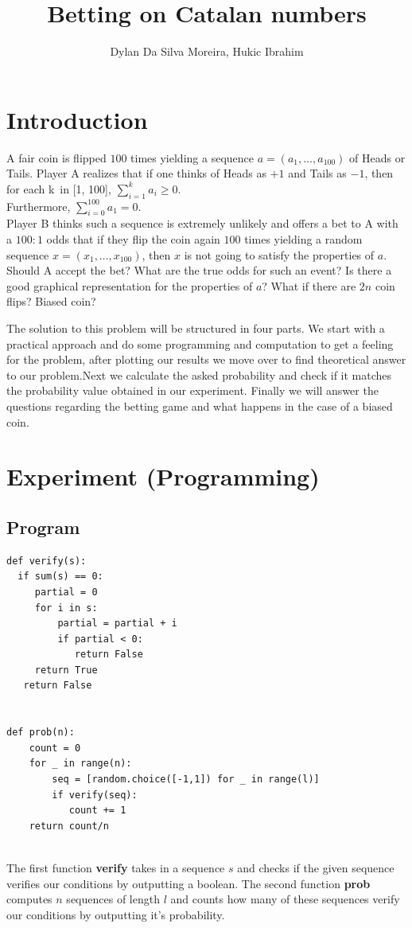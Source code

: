 \documentclass[a4paper,13pt,oneside]{article}
\title{Betting on Catalan numbers}
\author{Dylan Da Silva Moreira, Hukic Ibrahim}
\theoremstyle{remark}
\begin{document}
\maketitle
\tableofcontents
\newpage



\section{Introduction }

		A fair coin is flipped $100$ times yielding a sequence $a = (a_1,\dots, a_{100})$ of Heads or Tails. Player A realizes that if one thinks of Heads as $+1$ and Tails as $-1$, then for each k\ in [1, 100], $\sum_{i=1}^{k} a_i \geq 0$.
		\\Furthermore, $\sum_{i=0}^{100} a_1=0$.
		\\Player B thinks such a sequence is extremely unlikely and offers a bet to A with a $100 : 1$ odds that if they flip the coin again $100$ times yielding a random sequence $x = (x_1,\dots, x_{100})$, then $x$ is not going to satisfy the properties of $a$. Should A accept the bet? What are the true odds for such an event? Is there a good graphical representation for the properties of $a$? What if there are $2n$ coin flips? Biased coin?
		
\bigskip

\begin{flushleft}
The solution to this problem will be structured in four parts. We start with a practical approach and do some programming and computation to get a feeling for the problem, after plotting our results we move over to find theoretical answer to our problem.Next we calculate the asked probability and check if it matches the probability value obtained in our experiment. Finally we will answer the questions regarding the betting game and what happens in the case of a biased coin. 
\end{flushleft}
\pagebreak
\section{Experiment (Programming)}
\subsection{Program}
\begin{verbatim}
def verify(s):
  if sum(s) == 0: 
     partial = 0
     for i in s:
         partial = partial + i
         if partial < 0:
            return False
     return True
   return False
   
   
def prob(n):
    count = 0
    for _ in range(n):
        seq = [random.choice([-1,1]) for _ in range(l)]   
        if verify(seq):
           count += 1
    return count/n
	
	\end{verbatim}
The first function  \textbf{verify}  takes in a sequence $s$ and checks if the given  sequence verifies our conditions by outputting a boolean.
The second function \textbf{prob} computes $n$ sequences of length $l$ and counts how many of these sequences verify our conditions by outputting it's probability.\\
\end{document}
